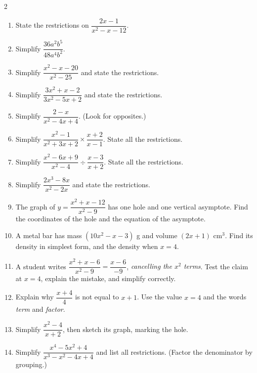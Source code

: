 \documentclass[11pt]{article}
\begin{document}
\begin{recapbox}
\begin{multicols}{2}
\small
\begin{enumerate}[leftmargin=*,itemsep=3pt]
  \item State the restrictions on $\dfrac{2x - 1}{x^2 - x - 12}$.
  \item Simplify $\dfrac{36a^2b^5}{48a^4b^2}$.
  \item Simplify $\dfrac{x^2 - x - 20}{x^2 - 25}$ and state the restrictions.
  \item Simplify $\dfrac{3x^2 + x - 2}{3x^2 - 5x + 2}$ and state the restrictions.
  \item Simplify $\dfrac{2-x}{x^2-4x+4}$. (Look for opposites.)
  \item Simplify $\dfrac{x^2 - 1}{x^2 + 3x + 2}\times\dfrac{x + 2}{x - 1}$. State all the restrictions.
  \item Simplify $\dfrac{x^2 - 6x + 9}{x^2 - 4}\div\dfrac{x - 3}{x + 2}$. State all the restrictions.
  \item Simplify $\dfrac{2x^3 - 8x}{x^2 - 2x}$ and state the restrictions.
  \item The graph of $y=\dfrac{x^2+x-12}{x^2-9}$ has one hole and one vertical asymptote. Find the coordinates of the hole and the equation of the asymptote.
  \item A metal bar has mass $(10x^2-x-3)$ g and volume $(2x+1)$ cm$^3$. Find its density in simplest form, and the density when $x=4$.
  \item A student writes $\dfrac{x^2+x-6}{x^2-9}=\dfrac{x-6}{-9}$, \emph{cancelling the $x^2$ terms}. Test the claim at $x=4$, explain the mistake, and simplify correctly.
  \item Explain why $\dfrac{x+4}{4}$ is not equal to $x+1$. Use the value $x=4$ and the words \emph{term} and \emph{factor}.
  \item Simplify $\dfrac{x^2-4}{x+2}$, then sketch its graph, marking the hole.
  \item Simplify $\dfrac{x^4 - 5x^2 + 4}{x^3 - x^2 - 4x + 4}$ and list all restrictions. (Factor the denominator by grouping.)
\end{enumerate}
\end{multicols}
\end{recapbox}
\end{document}
